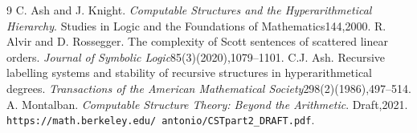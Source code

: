 \begin{thebibliography}{9}
 C. Ash and J. Knight. \emph{Computable Structures and the Hyperarithmetical Hierarchy}. Studies in Logic and the Foundations of Mathematics144,2000.
 R. Alvir and D. Rossegger. The complexity of Scott sentences of scattered linear orders. \emph{Journal of Symbolic Logic}85(3)(2020),1079--1101.
 C.J. Ash. Recursive labelling systems and stability of recursive structures in hyperarithmetical degrees. \emph{Transactions of the American Mathematical Society}298(2)(1986),497--514.
 A. Montalban. \emph{Computable Structure Theory: Beyond the Arithmetic}. Draft,2021. \texttt{https://math.berkeley.edu/\string~antonio/CSTpart2\_DRAFT.pdf}.
\end{thebibliography}
